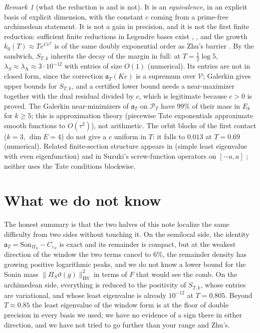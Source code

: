 \documentclass[11pt]{amsart}
\theoremstyle{definition}
\theoremstyle{remark}
\newtheorem{remark}[theorem]{Remark}
\newcommand{\PT}{\mathcal P_T}
\newcommand{\lamA}{\lambda_{\mathrm A}}
\newcommand{\Son}{\mathrm{Son}}
\begin{document}
\begin{remark}[what the reduction is and is not]
It is an \emph{equivalence}, in an explicit basis of explicit dimension, with the constant $c$ coming from a prime-free
archimedean statement. It is not a gain in precision, and it is not the first finite reduction: sufficient finite reductions in
Legendre bases exist \cite[Thm.~1.1]{Zhu2026}, \cite{Groskin2026}, and the growth $k_0(T)\approx Te^{Ce^T}$ is of the same
doubly exponential order as Zhu's barrier \cite[Thm.~1.4]{Zhu2026}. By the sandwich, $S_{T,k}$ inherits the decay of the margin
in full: at $T=\frac12\log5$, $\lambda_S\approx\lamA\approx3\cdot10^{-12}$ with entries of size $O(1)$ (numerical). Its entries
are not in closed form, since the correction $\mathfrak a_T(Ke)$ is a supremum over $\mathcal V$; Galerkin gives upper bounds for
$S_{T,k}$, and a certified lower bound needs a near-maximizer together with the dual residual divided by $c$, which is
legitimate because $c>0$ is proved. The Galerkin near-minimizers of $\mathfrak a_T$ on $\PT$ have $99\%$ of their mass in $E_k$
for $k\ge5$; this is approximation theory (piecewise Tate exponentials approximate smooth functions to $O(\tau^2)$), not
arithmetic. The orbit blocks of the first contact ($k=3$, $\dim E=4$) do not give a $c$ uniform in $T$: it falls to $0.013$ at
$T=0.69$ (numerical). Related finite-section structure appears in \cite{CvS2025} (simple least eigenvalue with even
eigenfunction) and in Suzuki's screw-function operators on $[-a,a]$ \cite{Suzuki2023,Suzuki2026}; neither uses the Tate
conditions blockwise.
\end{remark}

\section{What we do not know}\label{sec:open}

The honest summary is that the two halves of this note localize the same difficulty from two sides without touching it.
On the semilocal side, the identity $\mathfrak a_T=\Son_{\Pi_S}-C_{\varepsilon_S}$ is exact and its remainder is compact, but at the
weakest direction of the window the two terms cancel to $6\%$, the remainder density has growing positive logarithmic peaks,
and we do not know a lower bound for the Sonin mass $\|\Pi_S\vartheta(g)\|^2_{\mathrm{HS}}$ in terms of $F$ that would see the
comb. On the archimedean side, everything is reduced to the positivity of $S_{T,k}$, whose entries are variational, and whose
least eigenvalue is already $10^{-12}$ at $T=0.805$. Beyond $T\approx0.85$ the least eigenvalue of the window form is at the
floor of double precision in every basis we used; we have no evidence of a sign there in either direction, and we have not tried
to go further than your range and Zhu's.
\end{document}
